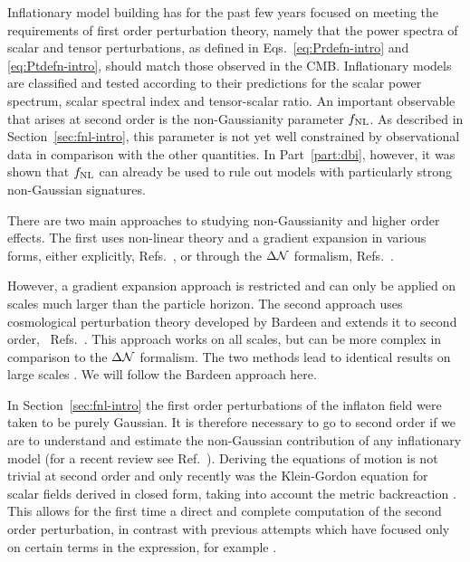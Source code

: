 Inflationary model building has for the past few years focused on
meeting the requirements of first order perturbation theory, namely
that the power spectra of scalar and tensor perturbations, as defined in
Eqs.~\eqref{eq:Prdefn-intro} and \eqref{eq:Ptdefn-intro}, should match
those observed in the CMB.  Inflationary
models are classified and tested according to their predictions for the scalar power
spectrum, scalar spectral index and tensor-scalar ratio. 
An important observable that arises at second order is the non-Gaussianity
parameter $f_{\mathrm{NL}}$. As described in Section~\ref{sec:fnl-intro}, this parameter is
not yet well constrained by observational data in comparison with the
other quantities. In Part~\ref{part:dbi}, however, it was shown that $f_{\mathrm{NL}}$ can
already be used to rule out models with particularly strong non-Gaussian signatures.


There are two main approaches to studying 
non-Gaussianity and higher order effects.  
The first uses non-linear theory and a gradient expansion in various
forms, either explicitly, \eg
Refs.~\cite{Salopek:1990jq,Rigopoulos:2005xx}, or through the
$\Delta \mathcal{N}$ formalism, \eg
Refs.~\cite{Starobinsky:1982ee,
Starobinsky:1986fxa, Sasaki:1995aw, Sasaki:1998ug,
Lyth:2004gb,Lyth:2005fi,Langlois:2006vv}.

However, a gradient expansion approach is restricted and can only be applied on
scales much larger than the particle horizon.  
The
second approach uses cosmological perturbation theory developed by Bardeen
\cite{Bardeen:1980kt} and extends it to second order,
\eg~Refs.~\cite{Tomita:1967,Mukhanov:1996ak,Bruni:1996im,
  Acquaviva:2002ud,Nakamura:2003wk,Noh:2004bc,
  Bernardeau:2002jy,Maldacena:2002vr,
  Finelli:2003bp,Bartolo:2004if,Enqvist:2004bk,Lyth:2005du,Seery:2005gb,
  Malik:2003mv, Barnaby:2006cq}\footnotemark.
%
This approach works on all scales, but can be more complex in comparison to the
$\Delta \mathcal{N}$ formalism. The two methods lead to identical results on large scales
\cite{Malik:2005cy}. We
will follow the Bardeen approach here.


In Section~\ref{sec:fnl-intro} the first order perturbations of the inflaton field
were taken to be purely Gaussian. It is therefore 
necessary to go to second order if we are to understand and estimate
the non-Gaussian contribution of any inflationary model (for a recent
review see Ref.~\cite{Malik:2008im}). Deriving the equations of motion is
not trivial at second order and only recently was the Klein-Gordon
equation for scalar fields derived in closed form, taking into account the
metric backreaction \cite{Malik:2006ir}. This allows for the first time
a direct and complete computation of the second order perturbation, in
contrast with previous attempts which have focused only on certain
terms in the expression, for example .


